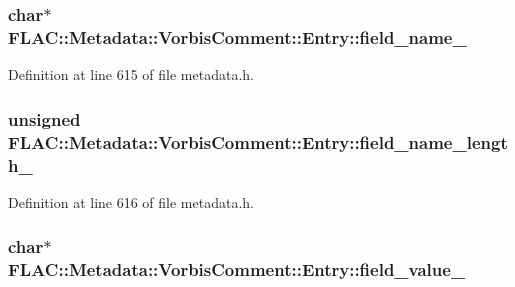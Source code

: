 \subsubsection[{\texorpdfstring{field\+\_\+name\+\_\+}{field_name_}}]{\setlength{\rightskip}{0pt plus 5cm}char$\ast$ F\+L\+A\+C\+::\+Metadata\+::\+Vorbis\+Comment\+::\+Entry\+::field\+\_\+name\+\_\+\hspace{0.3cm}{\ttfamily [protected]}}\hypertarget{class_f_l_a_c_1_1_metadata_1_1_vorbis_comment_1_1_entry_a0f587a7ee57eae5064504a3c129a4e78}{}\label{class_f_l_a_c_1_1_metadata_1_1_vorbis_comment_1_1_entry_a0f587a7ee57eae5064504a3c129a4e78}


Definition at line 615 of file metadata.\+h.

\subsubsection[{\texorpdfstring{field\+\_\+name\+\_\+length\+\_\+}{field_name_length_}}]{\setlength{\rightskip}{0pt plus 5cm}unsigned F\+L\+A\+C\+::\+Metadata\+::\+Vorbis\+Comment\+::\+Entry\+::field\+\_\+name\+\_\+length\+\_\+\hspace{0.3cm}{\ttfamily [protected]}}\hypertarget{class_f_l_a_c_1_1_metadata_1_1_vorbis_comment_1_1_entry_a122ef21f920ef8cc313fa2b1874c2555}{}\label{class_f_l_a_c_1_1_metadata_1_1_vorbis_comment_1_1_entry_a122ef21f920ef8cc313fa2b1874c2555}


Definition at line 616 of file metadata.\+h.

\subsubsection[{\texorpdfstring{field\+\_\+value\+\_\+}{field_value_}}]{\setlength{\rightskip}{0pt plus 5cm}char$\ast$ F\+L\+A\+C\+::\+Metadata\+::\+Vorbis\+Comment\+::\+Entry\+::field\+\_\+value\+\_\+\hspace{0.3cm}{\ttfamily [protected]}}\hypertarget{class_f_l_a_c_1_1_metadata_1_1_vorbis_comment_1_1_entry_a4fba27f11d6cb9d138c45f3d51c25759}{}\label{class_f_l_a_c_1_1_metadata_1_1_vorbis_comment_1_1_entry_a4fba27f11d6cb9d138c45f3d51c25759}


